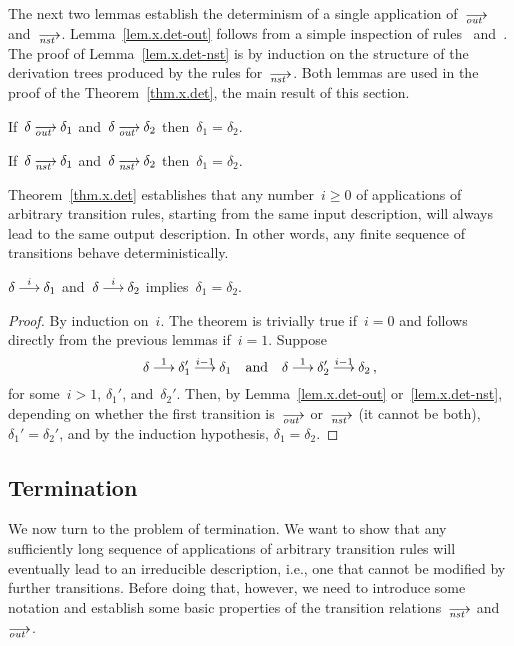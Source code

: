The next two lemmas establish the determinism of a single application
of~$\out$ and~$\nst$.  Lemma~\ref{lem.x.det-out} follows from a simple
inspection of rules~ and~.  The proof of
Lemma~\ref{lem.x.det-nst} is by induction on the structure of the derivation
trees produced by the rules for~$\nst$.  Both lemmas are used in the proof
of the Theorem~\ref{thm.x.det}, the main result of this section.

\begin{lemma}[label=lem.x.det-out,restate=lemxdetout]
  If~$\delta\out\delta_1$ and~$\delta\out\delta_2$ then~$\delta_1=\delta_2$.
\end{lemma}

\begin{lemma}[label=lem.x.det-nst,restate=lemxdetnst]
  If~$\delta\nst\delta_1$ and~$\delta\nst\delta_2$ then~$\delta_1=\delta_2$.
\end{lemma}

Theorem~\ref{thm.x.det} establishes that any number~$i\ge0$ of applications
of arbitrary transition rules, starting from the same input description,
will always lead to the same output description.  In other words, any finite
sequence of transitions behave deterministically.

\begin{theorem}[name=Determinism,label=thm.x.det,restate=thmxdet]
  $\delta\trans[i]\delta_1$ and~$\delta\trans[i]\delta_2$
  implies~$\delta_1=\delta_2$.
\end{theorem}
\begin{proof}
  By induction on~$i$.  The theorem is trivially true if~$i=0$ and follows
  directly from the previous lemmas if~$i=1$.  Suppose
  \[
    \delta\trans[1]\delta_1'\trans[i-1]\delta_1
    \quad\text{and}\quad
    \delta\trans[1]\delta_2'\trans[i-1]\delta_2\,,
  \]
  for some~$i>1$, $\delta_1'$, and~$\delta_2'$.
  Then, by Lemma~\ref{lem.x.det-out} or~\ref{lem.x.det-nst}, depending on
  whether the first transition is~$\out$ or~$\nst$ (it cannot be both),
  $\delta_1'=\delta_2'$, and by the induction hypothesis,
  $\delta_1=\delta_2$.
\end{proof}

\subsection{Termination}
\label{sec.proofs.term}

We now turn to the problem of termination.  We want to show that any
sufficiently long sequence of applications of arbitrary transition rules
will eventually lead to an irreducible description, i.e., one that cannot be
modified by further transitions.  Before doing that, however, we need to
introduce some notation and establish some basic properties of the
transition relations~$\nst$ and~$\out$.

